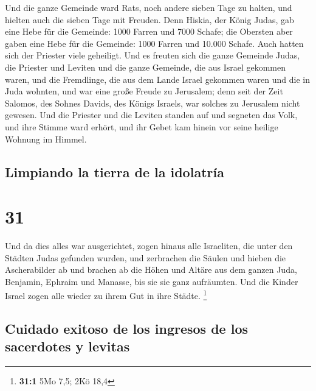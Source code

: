  Und die ganze Gemeinde ward Rats, noch andere sieben
Tage zu halten, und hielten auch die sieben Tage mit Freuden.
 Denn Hiskia, der König Judas, gab eine Hebe für die
Gemeinde: 1000 Farren und 7000 Schafe; die Obersten aber gaben eine Hebe
für die Gemeinde: 1000 Farren und 10.000 Schafe. Auch hatten sich der
Priester viele geheiligt.  Und es freuten sich die ganze
Gemeinde Judas, die Priester und Leviten und die ganze Gemeinde, die aus
Israel gekommen waren, und die Fremdlinge, die aus dem Lande Israel
gekommen waren und die in Juda wohnten,  und war eine
große Freude zu Jerusalem; denn seit der Zeit Salomos, des Sohnes
Davids, des Königs Israels, war solches zu Jerusalem nicht gewesen.
 Und die Priester und die Leviten standen auf und
segneten das Volk, und ihre Stimme ward erhört, und ihr Gebet kam hinein
vor seine heilige Wohnung im Himmel.

\hypertarget{limpiando-la-tierra-de-la-idolatruxeda}{%
\subsection{Limpiando la tierra de la
idolatría}\label{limpiando-la-tierra-de-la-idolatruxeda}}

\hypertarget{section-30}{%
\section{31}\label{section-30}}

 Und da dies alles war ausgerichtet, zogen hinaus alle
Israeliten, die unter den Städten Judas gefunden wurden, und zerbrachen
die Säulen und hieben die Ascherabilder ab und brachen ab die Höhen und
Altäre aus dem ganzen Juda, Benjamin, Ephraim und Manasse, bis sie sie
ganz aufräumten. Und die Kinder Israel zogen alle wieder zu ihrem Gut in
ihre Städte. \footnote{\textbf{31:1} 5Mo 7,5; 2Kö 18,4}

\hypertarget{cuidado-exitoso-de-los-ingresos-de-los-sacerdotes-y-levitas}{%
\subsection{Cuidado exitoso de los ingresos de los sacerdotes y
levitas}\label{cuidado-exitoso-de-los-ingresos-de-los-sacerdotes-y-levitas}}

